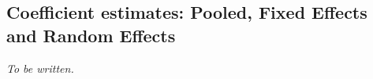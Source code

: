 \subsection{Coefficient estimates: Pooled, Fixed Effects and Random Effects}
\textit{To be written.}

% 
